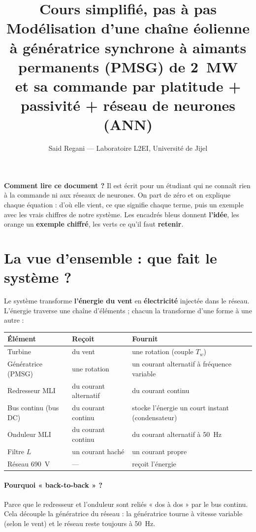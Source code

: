 \documentclass[11pt,a4paper]{article}
\title{\textbf{Cours simplifié, pas à pas}\\[3mm]
\large Modélisation d'une chaîne éolienne à génératrice synchrone à aimants permanents (PMSG) de 2~MW\\
et sa commande par platitude + passivité + réseau de neurones (ANN)}
\author{Said Regani — Laboratoire L2EI, Université de Jijel}
\date{}
\begin{document}
\maketitle

\begin{idee}
\textbf{Comment lire ce document ?}
Il est écrit pour un étudiant qui ne connaît rien à la commande ni aux réseaux de neurones. On part de
zéro et on explique chaque équation : d'où elle vient, ce que signifie chaque terme, puis un exemple
avec les vrais chiffres de notre système.
Les encadrés bleus donnent \textbf{l'idée}, les orange un \textbf{exemple chiffré}, les verts ce
qu'il faut \textbf{retenir}.
\end{idee}

\tableofcontents
\newpage

\section{La vue d'ensemble : que fait le système ?}

Le système transforme \textbf{l'énergie du vent} en \textbf{électricité} injectée dans le réseau.
L'énergie traverse une chaîne d'éléments ; chacun la transforme d'une forme à une autre :

\begin{center}
\begin{tabular}{lll}
\toprule
Élément & Reçoit & Fournit\\
\midrule
Turbine & du vent & une rotation (couple $T_w$)\\
Génératrice (PMSG) & une rotation & un courant alternatif à fréquence variable\\
Redresseur MLI & du courant alternatif & du courant continu\\
Bus continu (bus DC) & du courant continu & stocke l'énergie un court instant (condensateur)\\
Onduleur MLI & du courant continu & du courant alternatif à 50~Hz\\
Filtre $L$ & un courant haché & un courant propre\\
Réseau 690~V & --- & reçoit l'énergie\\
\bottomrule
\end{tabular}
\end{center}

\paragraph{Pourquoi « back-to-back » ?}
Parce que le redresseur et l'onduleur sont reliés « dos à dos » par le bus continu. Cela découple la
génératrice du réseau : la génératrice tourne à vitesse variable (selon le vent) et le réseau reste
toujours à 50~Hz.
\end{document}
